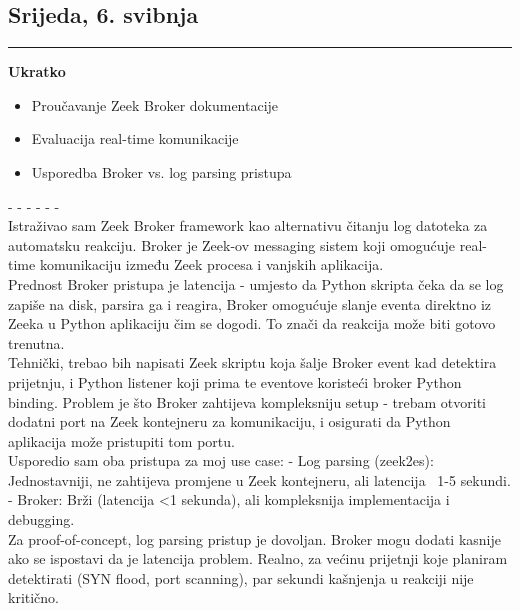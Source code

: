 \documentclass[12pt, a4paper]{article}
\newcommand{\dan}[1]{
    \subsection*{#1}
    \vspace{-0.5em} 
    \hrule \vspace{0.5em} 
}
\begin{document}
\dan{Srijeda, 6. svibnja}
\textbf{Ukratko}
\begin{itemize}
    \item Proučavanje Zeek Broker dokumentacije
    \item Evaluacija real-time komunikacije
    \item Usporedba Broker vs. log parsing pristupa
\end{itemize}
- - - - - - \\
Istraživao sam Zeek Broker framework kao alternativu čitanju log datoteka za automatsku reakciju. Broker je Zeek-ov messaging sistem koji omogućuje real-time komunikaciju između Zeek procesa i vanjskih aplikacija.
\\
Prednost Broker pristupa je latencija - umjesto da Python skripta čeka da se log zapiše na disk, parsira ga i reagira, Broker omogućuje slanje eventa direktno iz Zeeka u Python aplikaciju čim se dogodi. To znači da reakcija može biti gotovo trenutna.
\\
Tehnički, trebao bih napisati Zeek skriptu koja šalje Broker event kad detektira prijetnju, i Python listener koji prima te eventove koristeći broker Python binding. Problem je što Broker zahtijeva kompleksniju setup - trebam otvoriti dodatni port na Zeek kontejneru za komunikaciju, i osigurati da Python aplikacija može pristupiti tom portu.
\\
Usporedio sam oba pristupa za moj use case:
- Log parsing (zeek2es): Jednostavniji, ne zahtijeva promjene u Zeek kontejneru, ali latencija ~1-5 sekundi.
- Broker: Brži (latencija <1 sekunda), ali kompleksnija implementacija i debugging.
\\
Za proof-of-concept, log parsing pristup je dovoljan. Broker mogu dodati kasnije ako se ispostavi da je latencija problem. Realno, za većinu prijetnji koje planiram detektirati (SYN flood, port scanning), par sekundi kašnjenja u reakciji nije kritično.
\end{document}
